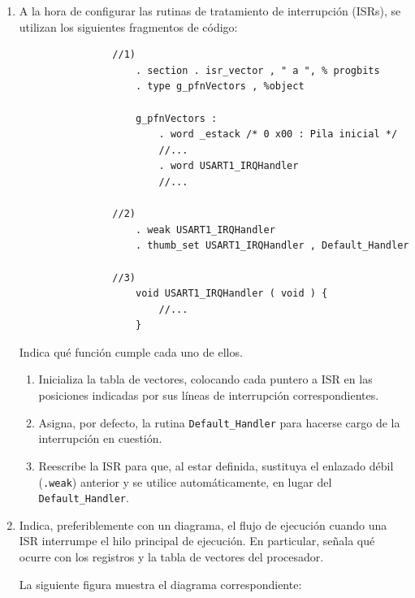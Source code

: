\documentclass[svgnames,spanish,11pt,a4paper]{article}
\newcounter{solution}
\begin{document}
\begin{enumerate}
        \item A la hora de configurar las rutinas de tratamiento de interrupción (ISRs), se utilizan los siguientes fragmentos de código:
        
            \begin{lstlisting}
                //1)
                    . section . isr_vector , " a ", % progbits
                    . type g_pfnVectors , %object
                
                    g_pfnVectors :
                        . word _estack /* 0 x00 : Pila inicial */
                        //...
                        . word USART1_IRQHandler
                        //...

                //2)
                    . weak USART1_IRQHandler
                    . thumb_set USART1_IRQHandler , Default_Handler

                //3)
                    void USART1_IRQHandler ( void ) {
                        //...
                    }             
            \end{lstlisting}

            Indica qué función cumple cada uno de ellos.

            \begin{solution}
                \begin{enumerate}
                    \item Inicializa la tabla de vectores, colocando cada puntero a ISR en las posiciones indicadas por sus líneas de interrupción correspondientes.
                    \item Asigna, por defecto, la rutina \texttt{Default\_Handler} para hacerse cargo de la interrupción en cuestión.
                    \item Reescribe la ISR para que, al estar definida, sustituya el enlazado débil (\texttt{.weak}) anterior y se utilice automáticamente, en lugar del \texttt{Default\_Handler}.
                \end{enumerate}
            \end{solution}

        \item Indica, preferiblemente con un diagrama, el flujo de ejecución cuando una ISR interrumpe el hilo principal de ejecución. En particular, señala qué ocurre con los registros y la tabla de vectores del procesador.
        
            \begin{solution}
                La siguiente figura muestra el diagrama correspondiente:


\end{solution}
\end{enumerate}
\end{document}
